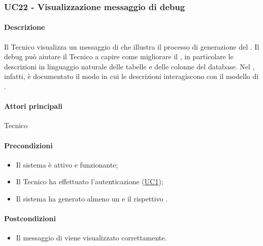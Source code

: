 \subsubsection{UC22 - Visualizzazione messaggio di debug}\label{UC22}
\paragraph*{Descrizione}
Il Tecnico visualizza un messaggio di  che illustra il processo di generazione del . Il debug può aiutare il Tecnico a capire come migliorare il , in particolare le descrizioni in linguaggio naturale delle tabelle e delle colonne del database. Nel , infatti, è documentato il modo in cui le descrizioni interagiscono con il modello di .

\paragraph*{Attori principali}
Tecnico

\paragraph*{Precondizioni}
\begin{itemize}
  \item Il sistema è attivo e funzionante;
  \item Il Tecnico ha effettuato l'autenticazione (\hyperref[UC1]{UC1});
  \item Il sistema ha generato almeno un  e il rispettivo .
\end{itemize}

\paragraph*{Postcondizioni}
\begin{itemize}
  \item Il messaggio di  viene visualizzato correttamente.
\end{itemize}

